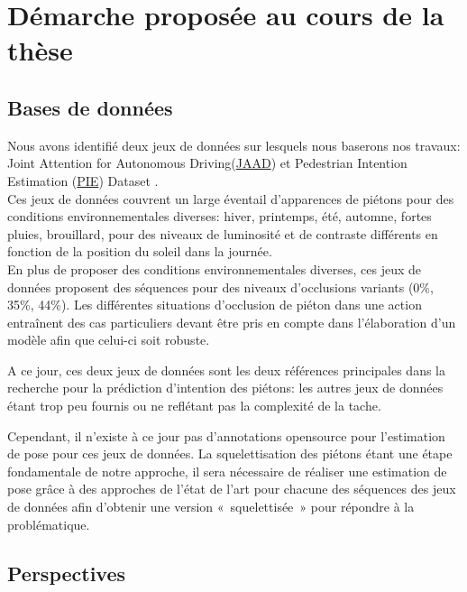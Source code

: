 \clearpage
\chapter{Démarche proposée au cours de la thèse}
\label{sec:SOTA}

\section{Bases de données}
Nous avons identifié deux jeux de données sur lesquels nous baserons nos travaux:
Joint Attention for Autonomous Driving(\href{http://jaad-explore.nvision2.eecs.yorku.ca/}{JAAD}) \cite{2016arXiv160904741K,Rasouli_2017_ICCV} et Pedestrian Intention Estimation (\href{https://data.nvision2.eecs.yorku.ca/PIE_dataset/}{PIE}) Dataset \cite{Rasouli2019PIE}.\\

Ces jeux de données couvrent un large éventail d'apparences de piétons pour des conditions environnementales diverses: hiver, printemps, été, automne, fortes pluies, brouillard, pour des niveaux de luminosité et de contraste différents en fonction de la position du soleil dans la journée.\\

En plus de proposer des conditions environnementales diverses, ces jeux de données proposent des séquences pour des niveaux d'occlusions variants (0\%, 35\%, 44\%). Les différentes situations d'occlusion de piéton dans une action entraînent des cas particuliers devant être pris en compte dans l'élaboration d'un modèle afin que celui-ci soit robuste.

A ce jour, ces deux jeux de données sont les deux références principales dans la recherche pour la prédiction d'intention des piétons: les autres jeux de données étant trop peu fournis ou ne reflétant pas la complexité de la tache.

Cependant, il n'existe à ce jour pas d'annotations opensource pour l'estimation de pose pour ces jeux de données. La squelettisation des piétons étant une étape fondamentale de notre approche, il sera nécessaire de réaliser une estimation de pose grâce à des approches de l'état de l'art pour chacune des séquences des jeux de données afin d'obtenir une version  « squelettisée » pour répondre à la problématique.


\section{Perspectives}

